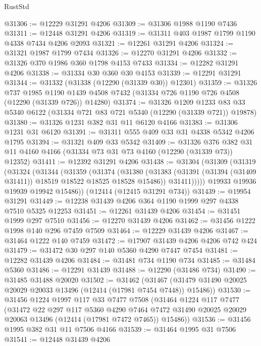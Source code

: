 \begin{lexlean}{RustStd}
\begin{coremodule}
{\begin{coremodule}
{{{{{{{{{{{{{{{{{{{{{{{{{{{{{{{{{{{{{{{{{{{{{{{{{{@31306 := @12229 @31291 @4206
@31309 := @31306 @1988 @1190 @7436
@31311 := @12448 @31291 @4206
@31319 := @31311 @403 @1987 @1799 @1190 @4338 @7434 @4206 @2093
@31321 := @12261 @31291 @4206
@31324 := @31321 @1987 @1799 @7434
@31326 := @12270 @31291 @4206
@31332 := @31326 @370 @1986 @360 @1798 @4153 @7433
@31334 := @12282 @31291 @4206
@31338 := @31334 @30 @360 @30 @4153
@31339 := @12291 @31291
@31344 := @31332 (@31338 (@12290 (@31339 @30)) @12301)
@31359 := @31326
    @737
    @1985
    @1190
    @1439
    @4508
    @7432
    (@31334 @726 @1190 @726 @4508 (@12290 (@31339 @726)) @14280)
@31374 := @31326
    @1209
    @1233
    @83
    @33
    @5340
    @6122
    (@31334 @721 @83 @721 @5340 (@12290 (@31339 @721)) @19878)
@31380 := @31326 @1231 @382 @31 @11 @6120 @4166
@31383 := @31306 @1231 @31 @6120
@31391 := @31311 @555 @409 @33 @31 @4338 @5342 @4206 @1795
@31394 := @31321 @409 @33 @5342
@31409 := @31326
    @376
    @382
    @31
    @11
    @4160
    @4166
    (@31334 @73 @31 @73 @4160 (@12290 (@31339 @73)) @12352)
@31411 := @12392 @31291 @4206
@31438 := @31304
    (@31309
      (@31319
        (@31324
          (@31344
            (@31359
              (@31374
                (@31380
                  (@31383 (@31391 (@31394 (@31409 @31411)) @18519 @18522 @18525 @18528 @15486))
                  @31411)))))
        @19933
        @19936
        @19939
        @19942
        @15486))
    (@12414 (@12415 @31291 @734))
@31439 := @19954 @31291
@31449 := @12238 @31439 @4206 @364 @1190 @1999 @297 @4338 @7510 @5325 @12253
@31451 := @12261 @31439 @4206
@31454 := @31451 @1999 @297 @7510
@31456 := @12270 @31439 @4206
@31462 := @31456 @1222 @1998 @140 @296 @7459 @7509
@31464 := @12229 @31439 @4206
@31467 := @31464 @1222 @140 @7459
@31472 := @17907 @31439 @4206 @4206 @742 @424
@31479 := @31472 @30 @297 @140 @5360 @4290 @7447 @7454
@31481 := @12282 @31439 @4206
@31484 := @31481 @734 @1190 @734
@31485 := @31484 @5360
@31486 := @12291 @31439
@31488 := @12290 (@31486 @734)
@31490 := @31485 @31488 @20020
@31502 := @31462
    (@31467 (@31479 @31490 @20025 @20029 @20033 @13496 (@12414 (@17981 @7454 @7448)) @15486))
@31530 := @31456
    @1224
    @1997
    @117
    @33
    @7477
    @7508
    (@31464
      @1224
      @117
      @7477
      (@31472
        @22
        @297
        @117
        @5360
        @4290
        @7464
        @7472
        @31490
        @20025
        @20029
        @20063
        @13496
        (@12414 (@17981 @7472 @7465))
        @15486))
@31536 := @31456 @1995 @382 @31 @11 @7506 @4166
@31539 := @31464 @1995 @31 @7506
@31541 := @12448 @31439 @4206
}}}}}}}}}}}}}}}}}}}}}}}}}}}}}}}}}}}}}}}}}}}}}}}}}}
\end{coremodule}}
\end{coremodule}
\end{lexlean}
